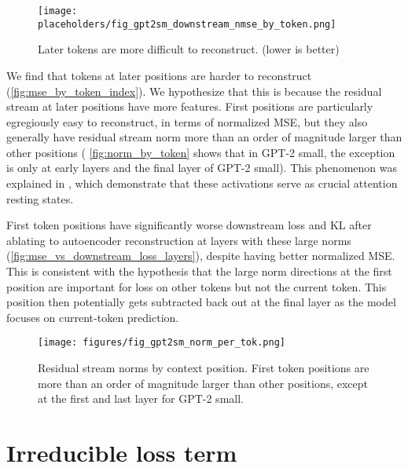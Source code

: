 \begin{figure}
    \centering
    \texttt{[image: placeholders/fig\_gpt2sm\_downstream\_nmse\_by\_token.png]}
    \caption{Later tokens are more difficult to reconstruct. (lower is better) }
    \label{fig:mse_by_token_index}
\end{figure}

We find that tokens at later positions are harder to reconstruct (\autoref{fig:mse_by_token_index}).  We hypothesize that this is because the residual stream at later positions have more features.  First positions are particularly egregiously easy to reconstruct, in terms of normalized MSE, but they also generally have residual stream norm more than an order of magnitude larger than other positions ( \autoref{fig:norm_by_token} shows that in GPT-2 small, the exception is only at early layers and the final layer of GPT-2 small).  This phenomenon was explained in \citep{sun2024massive,xiao2023efficient}, which demonstrate that these activations serve as crucial attention resting states.



First token positions have significantly worse downstream loss and KL after ablating to autoencoder reconstruction at layers with these large norms (\autoref{fig:mse_vs_downstream_loss_layers}), despite having better normalized MSE.  %
This is consistent with the hypothesis that the large norm directions at the first position are important for loss on other tokens but not the current token.  This position then potentially gets subtracted back out at the final layer as the model focuses on current-token prediction.

\begin{figure}
    \centering
    \texttt{[image: figures/fig\_gpt2sm\_norm\_per\_tok.png]}
    \caption{Residual stream norms by context position.  First token positions are more than an order of magnitude larger than other positions, except at the first and last layer for GPT-2 small.}
    \label{fig:norm_by_token}
\end{figure}



















\section{Irreducible loss term}\label{sec:random-data-aes}


